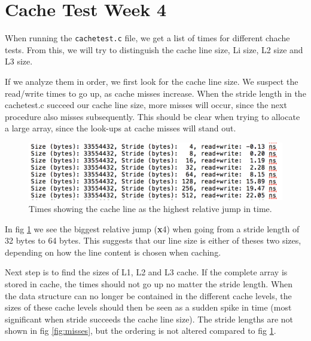 \section{Cache Test Week 4}

When running the \texttt{cachetest.c} file, we get a list of times for different chache tests. From this, we will try to distinguish the cache line size, Li size, L2 size and L3 size.

If we analyze them in order, we first look for the cache line size. We suspect the read/write times to go up, as cache misses increase. When the stride length in the cachetest.c succeed our cache line size, more misses will occur, since the next procedure also misses subsequently. This should be clear when trying to allocate a large array, since the look-ups at cache misses will stand out. 

\begin{figure}[h]
    \centering
    \includegraphics[width=\linewidth]{Week4/fig/CacheBlock.png}
    \caption{Times showing the cache line as the highest relative jump in time.}
    \label{fig:cacheblock}
\end{figure}

In fig \ref{fig:cacheblock} we see the biggest relative jump (\textbf{x}4) when going from a stride length of 32 bytes to 64 bytes. This suggests that our line size is either of theses two sizes, depending on how the line content is chosen when caching. 

Next step is to find the sizes of L1, L2 and L3 cache. If the complete array is stored in cache, the times should not go up no matter the stride length. When the data structure can no longer be contained in the different cache levels, the sizes of these cache levels should then be seen as a sudden spike in time (most significant when stride succeeds the cache line size). The stride lengths are not shown in fig \ref{fig:misses}, but the ordering is not altered compared to fig \ref{fig:cacheblock}.

